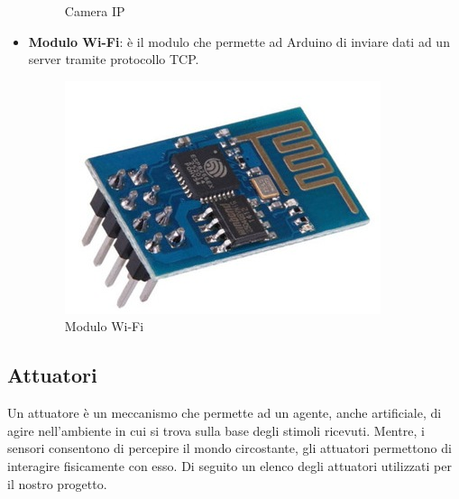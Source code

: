 \documentclass[a4paper,12pt,italian]{article}
\begin{document}
\begin{itemize}
\begin{figure}[H]
\begin{center}
			\caption{Camera IP}
			\label{Fig: camera}
			\end{center}
		\end{figure}
	\item \textbf{Modulo Wi-Fi}: è il modulo che permette ad Arduino di inviare dati ad un server tramite protocollo TCP.
		\begin{figure}[H]
			\begin{center}
			\includegraphics[scale=0.2]{wifi}
			\caption{Modulo Wi-Fi}
			\label{Fig: wifi}
			\end{center}
		\end{figure}

\end{itemize}

\subsection{Attuatori}
Un attuatore è un meccanismo che permette ad un agente, anche artificiale,  di agire nell’ambiente in cui si trova sulla base degli stimoli ricevuti. Mentre, i sensori consentono di percepire il mondo circostante, gli attuatori permettono di interagire fisicamente con esso. Di seguito un elenco degli attuatori utilizzati per il nostro progetto.
\end{document}
